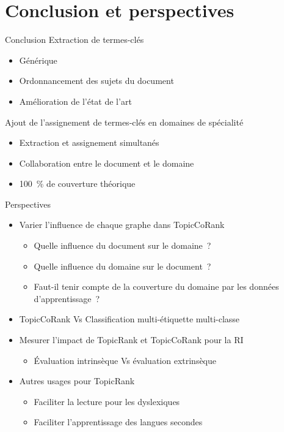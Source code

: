\section{Conclusion et perspectives}
  \begin{frame}{Conclusion}
    Extraction de termes-clés
    \begin{itemize}
      \item{Générique}
      \item{Ordonnancement des sujets du document}
      \item{Amélioration de l'état de l'art}
    \end{itemize}

    \vspace{1em}

    Ajout de l'assignement de termes-clés en domaines de spécialité
    \begin{itemize}
      \item{Extraction et assignement simultanés}
      \item{Collaboration entre le document et le domaine}
      \item{100~\% de couverture théorique}
    \end{itemize}
  \end{frame}

  \begin{frame}{Perspectives}
    \begin{itemize}
      \item{Varier l'influence de chaque graphe dans TopicCoRank}
      \begin{itemize}
        \item{Quelle influence du document sur le domaine~?}
        \item{Quelle influence du domaine sur le document~?}
        \item{Faut-il tenir compte de la couverture du domaine par les données
              d'apprentissage~?}
      \end{itemize}
      \item{TopicCoRank Vs Classification multi-étiquette multi-classe}
      \item{Mesurer l'impact de TopicRank et TopicCoRank pour la RI}
      \begin{itemize}
        \item{Évaluation intrinsèque Vs évaluation extrinsèque}
      \end{itemize}
      \item{Autres usages pour TopicRank}
      \begin{itemize}
        \item{Faciliter la lecture pour les
              dyslexiques~\cite{rello2014dislexia}}
        \item{Faciliter l'apprentissage des langues
              secondes~\cite{pressley1982mnemonickeywordmethod}}
      \end{itemize}
    \end{itemize}
  \end{frame}

